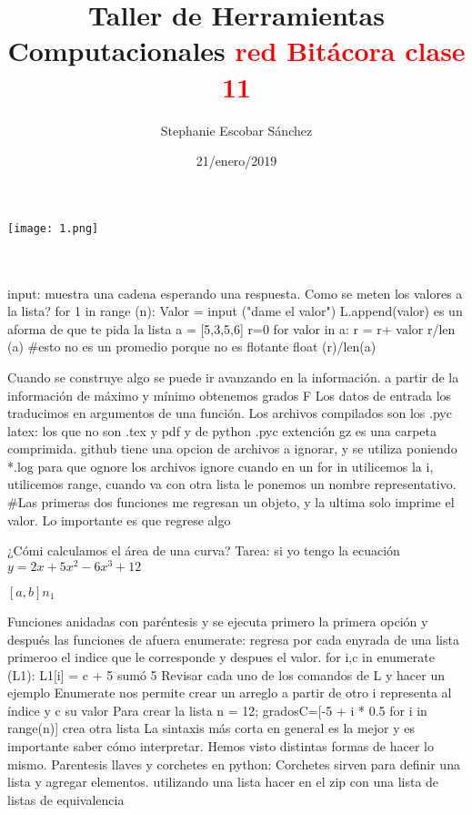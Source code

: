 \documentclass{article}
\title{\Huge Taller de Herramientas Computacionales}
\author{Stephanie Escobar Sánchez}
\date{21/enero/2019}
\begin{document}
	\maketitle
\begin{center}
	\texttt{[image: 1.png]}	
\end{center}
\newpage
\title{  \textcolor{red }{red Bitácora clase 11} } \\
\\



input: muestra una cadena esperando una respuesta.
Como se meten los valores a la lista?
for 1 in range (n):
	Valor = input ("dame el valor")
	L.append(valor)
es un aforma de que te pida la lista 
a = [5,3,5,6]
r=0
for valor in a:
r = r+ valor
r/len (a) \#esto no es un promedio porque no es flotante
float (r)/len(a) 
	

Cuando se construye algo se puede ir avanzando en la información. 
a partir de la información de máximo y mínimo obtenemos grados F
Los datos de entrada los traducimos en argumentos de una función.
Los archivos compilados son los .pyc
latex: los que no son .tex y pdf y de python .pyc
extención gz es una carpeta comprimida. github tiene una opcion de archivos a ignorar, y se utiliza poniendo *.log para que ognore los archivos ignore 
cuando en un for in utilicemos la i, utilicemos range, cuando va con otra lista le ponemos un nombre representativo.
\#Las primeras dos funciones me regresan un objeto, y la ultima solo imprime el valor. Lo importante es que regrese algo

¿Cómi calculamos el área de una curva?
Tarea: si yo tengo la ecuación $y= 2x+5x^{2}-6x^{3}+12$

$[a,b] n_{1} $

Funciones anidadas con paréntesis y se ejecuta primero la primera opción  y después las funciones de afuera
enumerate: regresa por cada enyrada de una lista primeroo el indice que le corresponde y despues el valor.
for i,c in enumerate (L1):
L1[i] = c + 5
sumó 5 
Revisar cada uno de los comandos de L y hacer un ejemplo
Enumerate nos permite crear un arreglo a partir de otro i representa al índice y c su valor
Para crear la lista n = 12; gradosC=[-5 + i * 0.5 for i in range(n)] crea otra lista 
La sintaxis más corta en general es la mejor y es importante saber cómo interpretar. Hemos visto distintas formas de hacer lo mismo.
Parentesis llaves y corchetes en python: Corchetes sirven para definir una lista y agregar elementos.
utilizando una lista hacer en el zip con una lista de listas de equivalencia
\end{document}
